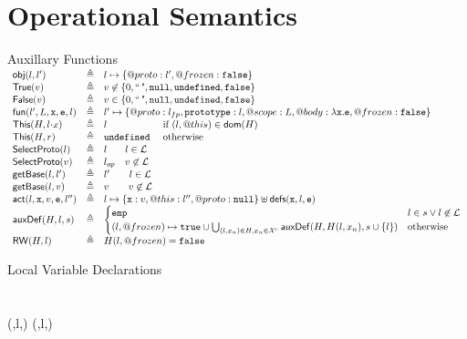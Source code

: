\documentclass[a4paper,notitlepage]{report}
\begin{document}
\chapter{Operational Semantics}
\label{app:opsems}
\newcommand{\auxf}[2]{#1 & \triangleq & #2}
\begin{display}{Auxillary Functions}
  $\begin{array}{lcl}
  \auxf{\obj(l,l')}{l \pointsto \{@proto: l', @frozen: \false\}}\\
  \auxf{\istrue(v)}{v\not\in\{0,\emptystr,\nil,\und,\false\}}\\
  \auxf{\isfalse(v)}{v\in   \{0,\emptystr,\nil,\und,\false\}}\\
  \auxf{\fun(l',L,\js x,\js e,l)}{l'\mapsto\{@proto: \lfp, \js{prototype}:
        l, @scope: L, @body: \lambda \js{x.e}, @frozen: \false\}}\\
  \auxf{\pickThis(H, \fld{l}{x})}{l \phantom{\und} \quad
        \text{if } (l,@this) \in \dom(H)}\\
  \auxf{\pickThis(H, r)}{\und \phantom{l} \quad \text{otherwise}}\\
  \auxf{\objOrGlob(l)}{l\phantom{_{op}} \quad l\in \loc}\\
  \auxf{\objOrGlob(v)}{\lop \quad v\not\in\loc}\\
  \auxf{\getBase(l,l')}{l' \qquad l \in \loc}\\
  \auxf{\getBase(l,v)}{v \qquad v\not\in\loc}\\

  \auxf{\act(l,\js{x},v,\js{e},l'')}{l\pointsto\{\js{x}:
    v,@this: l'',@proto: \nil\}\disju \defs(\js{x},l,\js{e})}\\

  \auxf{\auxDef(H,l,s)}{\begin{cases}
      \emp & l \in s \lor l \not\in \loc\\
      (l,@frozen) \mapsto \true \cup \bigcup_{(l,x_n) \in H, x_n \in \uvars}
      \auxDef(H,H(l,x_n),s \cup\{l\}) & \mbox{otherwise} \\
    \end{cases}}\\
  \auxf{\ReadWrite(H, l)}{H(l, @frozen) = \false} \\
  \end{array}$
\end{display}
  \begin{display}{Local Variable Declarations}
     \\
     \\
     \\
      {(,l,) \cup {}(,l,)} \\
     \\
  \end{display}
\end{document}
